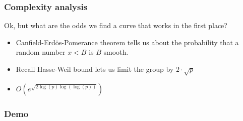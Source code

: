 \documentclass{beamer}
\begin{document}
\begin{frame}
\frametitle{Complexity analysis}

Ok, but what are the odds we find a curve that works in the first place?

\pause

\begin{itemize}[<+->]
	\item Canfield-Erdös-Pomerance theorem tells us about the probability that a
		random number $x < B$ is $B$ smooth. \\
	\item Recall Hasse-Weil bound lets us limit the group by $2 \cdot \sqrt{p}$  \\
	\item $O\left(e^{\sqrt{2\log(p) \log\left(\log(p)\right)}}\right)$
\end{itemize}

\end{frame}

\begin{frame}
\frametitle{Demo}
\end{frame}
\end{document}
